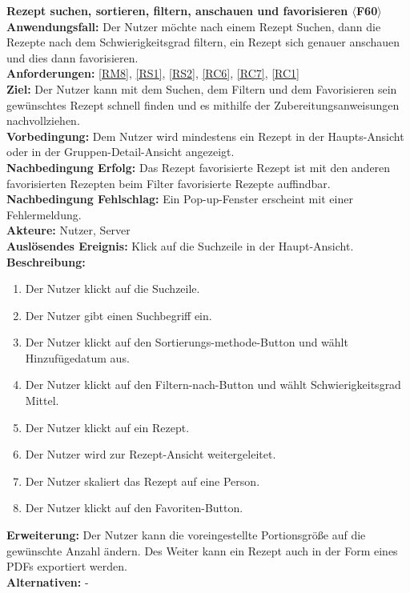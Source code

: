\documentclass[parskip=full]{scrartcl}
\begin{document}
\textbf{Rezept suchen, sortieren, filtern, anschauen und favorisieren $\langle$F60$\rangle$}\\
\textbf{Anwendungsfall:} Der Nutzer möchte nach einem Rezept Suchen, dann die Rezepte nach dem Schwierigkeitsgrad filtern, ein Rezept sich genauer anschauen und dies dann favorisieren.\\
\textbf{Anforderungen:} \ref{RM8}, \ref{RS1}, \ref{RS2}, \ref{RC6}, \ref{RC7}, \ref{RC1} \\
\textbf{Ziel:} Der Nutzer kann mit dem Suchen, dem Filtern und dem Favorisieren sein gewünschtes Rezept schnell finden und es mithilfe der Zubereitungsanweisungen nachvollziehen.\\
\textbf{Vorbedingung:} Dem Nutzer wird mindestens ein Rezept in der Haupts-Ansicht oder in der Gruppen-Detail-Ansicht angezeigt.\\
\textbf{Nachbedingung Erfolg:} Das Rezept favorisierte Rezept ist mit den anderen favorisierten Rezepten beim Filter favorisierte Rezepte auffindbar.\\
\textbf{Nachbedingung Fehlschlag:} Ein Pop-up-Fenster erscheint mit einer Fehlermeldung.\\
\textbf{Akteure:} Nutzer, Server\\
\textbf{Auslösendes Ereignis:} Klick auf die Suchzeile in der Haupt-Ansicht.\\
\textbf{Beschreibung:}
\begin{enumerate}
    \item Der Nutzer klickt auf die Suchzeile.
    \item Der Nutzer gibt einen Suchbegriff ein.
    \item Der Nutzer klickt auf den Sortierungs-methode-Button und wählt Hinzufügedatum aus.
    \item Der Nutzer klickt auf den Filtern-nach-Button und wählt Schwierigkeitsgrad Mittel.
    \item Der Nutzer klickt auf ein Rezept.
    \item Der Nutzer wird zur Rezept-Ansicht weitergeleitet.
    \item Der Nutzer skaliert das Rezept auf eine Person.
    \item Der Nutzer klickt auf den Favoriten-Button.
\end{enumerate}
\textbf{Erweiterung:} Der Nutzer kann die voreingestellte Portionsgröße auf die gewünschte Anzahl ändern. Des Weiter kann ein Rezept auch in der Form eines PDFs exportiert werden.\\
\textbf{Alternativen:} -\\
\newpage
\end{document}
